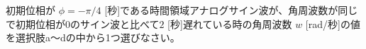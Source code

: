 初期位相が $\phi=-\pi/4$ [秒]である時間領域アナログサイン波が、角周波数が同じで初期位相が$0$のサイン波と比べて$2$ [秒]遅れている時の角周波数 $w$ [rad/秒]の値を選択肢a〜dの中から1つ選びなさい。
